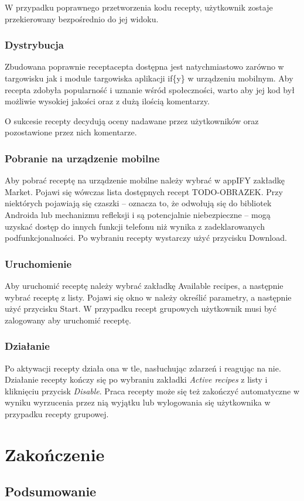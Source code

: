\documentclass[11pt,a4paper,polish,thesis]{dcsbook}
\begin{document}
W przypadku poprawnego przetworzenia kodu recepty, użytkownik zostaje przekierowany bezpośrednio do jej widoku.
\subsection{Dystrybucja}
Zbudowana poprawnie receptacepta dostępna jest natychmiastowo zarówno w targowisku jak i module targowiska aplikacji if\{y\} w urządzeniu mobilnym. Aby recepta
zdobyła popularność i uznanie wśród społeczności, warto aby jej kod był możliwie wysokiej jakości oraz z dużą ilością komentarzy.

O sukcesie recepty decydują oceny nadawane przez użytkowników oraz pozostawione przez nich komentarze.
\subsection{Pobranie na urządzenie mobilne}
Aby pobrać receptę na urządzenie mobilne należy wybrać w appIFY zakładkę Market. Pojawi się wówczas lista dostępnych recept TODO-OBRAZEK. Przy niektórych pojawiają się czaszki -- oznacza to, że odwołują się do bibliotek Androida lub mechanizmu refleksji i są potencjalnie niebezpieczne -- mogą uzyskać dostęp do innych funkcji telefonu niż wynika z zadeklarowanych podfunkcjonalności. 
Po wybraniu recepty wystarczy użyć przycisku Download.
\subsection{Uruchomienie}
Aby uruchomić receptę należy wybrać zakładkę Available recipes, a następnie wybrać receptę z listy. Pojawi się okno w należy określić parametry, a następnie użyć przycisku Start. W przypadku recept grupowych użytkownik musi być zalogowany aby uruchomić receptę.
\subsection{Działanie}
Po aktywacji recepty działa ona w tle, nasłuchując zdarzeń i reagując na nie. Działanie recepty kończy się po wybraniu zakładki \emph{Active recipes} z listy i
kliknięciu przycisk \emph{Disable}. Praca recepty może się też zakończyć automatyczne w wyniku wyrzucenia przez nią wyjątku lub wylogowania się użytkownika w
przypadku recepty grupowej.

\chapter{Zakończenie}
\section{Podsumowanie}
\end{document}

